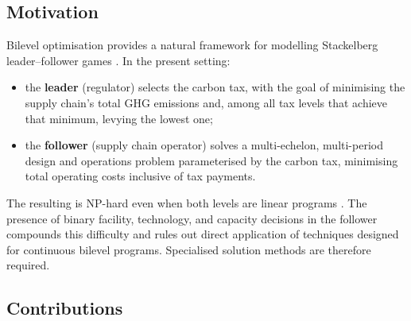 \subsection{Motivation}
\label{sec:intro:motivation}

Bilevel optimisation provides a natural framework for modelling
Stackelberg leader--follower games \citep{colson2007, dempe2002}. In
the present setting:
\begin{itemize}
  \item the \textbf{leader} (regulator) selects the carbon tax, with
        the goal of minimising the supply chain's total GHG emissions
        and, among all tax levels that achieve that minimum, levying
        the lowest one;
  \item the \textbf{follower} (supply chain operator) solves a
        multi-echelon, multi-period \CLSC design and operations
        problem parameterised by the carbon tax, minimising
        total operating costs inclusive of tax payments.
\end{itemize}
The resulting \BLMIP is NP-hard even when both levels are linear
programs \citep{jeroslow1985}. The presence of binary facility,
technology, and capacity decisions in the follower compounds this
difficulty and rules out direct application of techniques designed
for continuous bilevel programs. Specialised solution methods are
therefore required.

\subsection{Contributions}
\label{sec:intro:contributions}

